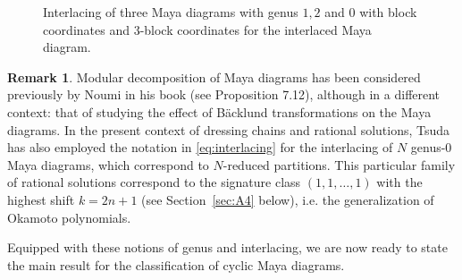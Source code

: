 \documentclass[10pt]{amsart}
\theoremstyle{definition}
\newtheorem{remark}[thm]{Remark}
\numberwithin{equation}{section}
\numberwithin{figure}{section}
\begin{document}
\begin{figure}[h]




\caption{Interlacing of three Maya diagrams with genus $1,2$ and $0$ with block coordinates and \mbox{$3$-block} coordinates for the interlaced Maya diagram.}\label{fig:interlacing}
\end{figure}

\begin{remark}
Modular decomposition of Maya diagrams has been considered previously by Noumi in his book  \cite{noumi2004painleve} (see Proposition 7.12), although in a different context: that of studying the effect of B\"acklund transformations on the Maya diagrams. In the present context of dressing chains and rational solutions, Tsuda \cite{tsuda2005universal} has also employed the notation in \eqref{eq:interlacing} for the interlacing of $N$ genus-0 Maya diagrams, which correspond to $N$-reduced partitions. This particular family of rational solutions correspond to the signature class $(1,1,\dots,1)$ with the highest shift $k=2n+1$ (see Section~\ref{sec:A4} below), i.e. the generalization of Okamoto polynomials.
\end{remark}

Equipped with these notions of genus and interlacing, we are now ready
to state the main result for the classification of cyclic Maya
diagrams.



\end{document}
